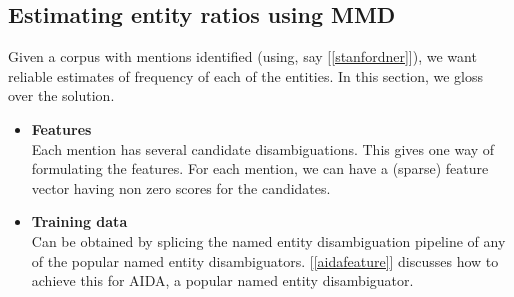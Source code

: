 \subsection{Estimating entity ratios using MMD}
Given a corpus with mentions identified (using, say [\ref{stanfordner}]), we want
reliable estimates of frequency of each of the entities. In this section, we gloss over the solution.
\begin{itemize}
\item \textbf{Features}  \\ Each mention has several candidate disambiguations. This gives one way of 
formulating the features. For each mention, we can have a (sparse) feature vector having non zero scores
for the candidates.
\item \textbf{Training data} \\ Can be obtained by splicing the named entity disambiguation pipeline of 
any of the popular named entity disambiguators. [\ref{aidafeature}] discusses how to achieve this for AIDA,
a popular named entity disambiguator. 
\end{itemize}





